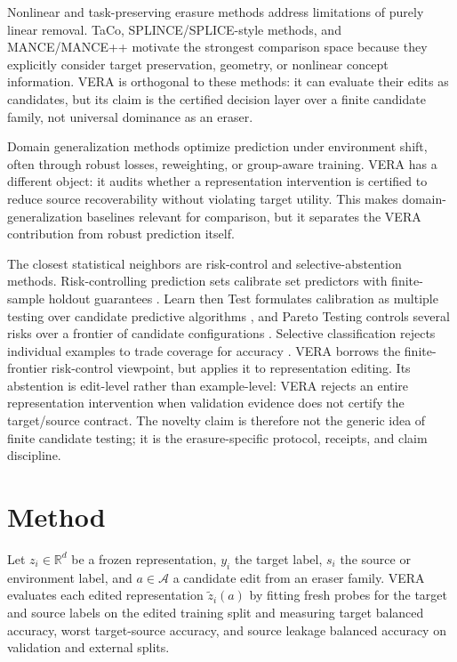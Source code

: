 \documentclass[10pt]{article}
\begin{document}
Nonlinear and task-preserving erasure methods address limitations of purely
linear removal. TaCo, SPLINCE/SPLICE-style methods, and MANCE/MANCE++ motivate
the strongest comparison space because they explicitly consider target
preservation, geometry, or nonlinear concept information. VERA is orthogonal to
these methods: it can evaluate their edits as candidates, but its claim is the
certified decision layer over a finite candidate family, not universal
dominance as an eraser.

Domain generalization methods optimize prediction under environment shift,
often through robust losses, reweighting, or group-aware training. VERA has a
different object: it audits whether a representation intervention is certified
to reduce source recoverability without violating target utility. This makes
domain-generalization baselines relevant for comparison, but it separates the
VERA contribution from robust prediction itself.

The closest statistical neighbors are risk-control and selective-abstention
methods. Risk-controlling prediction sets calibrate set predictors with
finite-sample holdout guarantees \cite{bates2021rcps}. Learn then Test
formulates calibration as multiple testing over candidate predictive
algorithms \cite{angelopoulos2021ltt}, and Pareto Testing controls several
risks over a frontier of candidate configurations \cite{laufer2022pareto}.
Selective classification rejects individual examples to trade coverage for
accuracy \cite{geifman2017selective}. VERA borrows the finite-frontier
risk-control viewpoint, but applies it to representation editing. Its
abstention is edit-level rather than example-level: VERA rejects an entire
representation intervention when validation evidence does not certify the
target/source contract. The novelty claim is therefore not the generic idea of
finite candidate testing; it is the erasure-specific protocol, receipts, and
claim discipline.

\section{Method}

Let $z_i \in \mathbb{R}^d$ be a frozen representation, $y_i$ the target label,
$s_i$ the source or environment label, and $a \in \mathcal{A}$ a candidate edit
from an eraser family. VERA evaluates each edited representation
$\tilde z_i(a)$ by fitting fresh probes for the target and source labels on the
edited training split and measuring target balanced accuracy, worst
target-source accuracy, and source leakage balanced accuracy on validation and
external splits.
\end{document}
